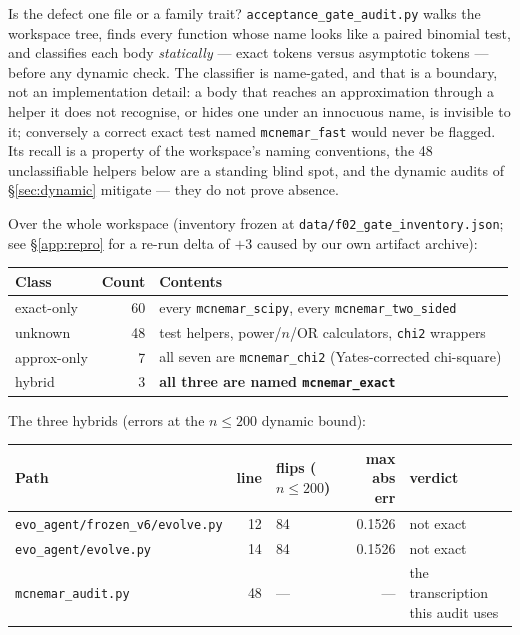 \documentclass[10pt]{article}
\newcommand{\code}[1]{\texttt{#1}}
\begin{document}
Is the defect one file or a family trait? \code{acceptance\_gate\_audit.py}
walks the workspace tree, finds every function whose name looks like a paired
binomial test, and classifies each body \emph{statically} --- exact tokens
versus asymptotic tokens --- before any dynamic check. The classifier is
name-gated, and that is a boundary, not an implementation detail: a body that
reaches an approximation through a helper it does not recognise, or hides one
under an innocuous name, is invisible to it; conversely a correct exact test
named \code{mcnemar\_fast} would never be flagged. Its recall is a property
of the workspace's naming conventions, the 48 unclassifiable helpers below
are a standing blind spot, and the dynamic audits of \S\ref{sec:dynamic}
mitigate --- they do not prove absence.

Over the whole workspace (inventory frozen at
\code{data/f02\_gate\_inventory.json}; see \S\ref{app:repro} for a
re-run delta of $+3$ caused by our own artifact archive):

\begin{center}
\begin{tabular}{lrl}
\toprule
Class & Count & Contents \\
\midrule
exact-only & 60 & every \code{mcnemar\_scipy}, every \code{mcnemar\_two\_sided} \\
unknown & 48 & test helpers, power/$n$/OR calculators, \code{chi2} wrappers \\
approx-only & 7 & all seven are \code{mcnemar\_chi2} (Yates-corrected chi-square) \\
hybrid & 3 & \textbf{all three are named \code{mcnemar\_exact}} \\
\bottomrule
\end{tabular}
\end{center}

\noindent The three hybrids (errors at the $n\le200$ dynamic bound):

\begin{center}
\footnotesize
\begin{tabular}{lrlrl}
\toprule
Path & line & flips ($n\le200$) & max abs err & verdict \\
\midrule
\code{evo\_agent/frozen\_v6/evolve.py} & 12 & 84 & 0.1526 & not exact \\
\code{evo\_agent/evolve.py} & 14 & 84 & 0.1526 & not exact \\
\code{mcnemar\_audit.py} & 48 & --- & --- & the transcription this audit uses \\
\bottomrule
\end{tabular}
\end{center}
\end{document}
